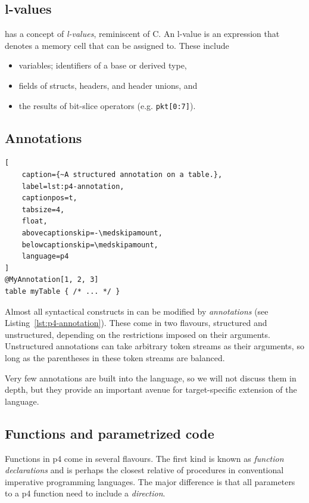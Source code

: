 \subsection*{l-values}

\pfs has a concept of \emph{l-values}, reminiscent of C. An l-value is an
expression that denotes a memory cell that can be assigned to. These include

\begin{itemize}
	\item variables; identifiers of a base or derived type,
	\item fields of structs, headers, and header unions, and
	\item the results of bit-slice operators (e.g. \texttt{pkt[0:7]}).
\end{itemize}

\subsection*{Annotations}

\begin{lstlisting}[
	caption={~A structured annotation on a table.},
	label=lst:p4-annotation,
	captionpos=t,
	tabsize=4,
	float,
	abovecaptionskip=-\medskipamount,
	belowcaptionskip=\medskipamount,
	language=p4
]
@MyAnnotation[1, 2, 3]
table myTable { /* ... */ }
\end{lstlisting}

Almost all syntactical constructs in \pfs can be modified by \emph{annotations}
(see Listing~\ref{lst:p4-annotation}). These come in two flavours, structured
and unstructured, depending on the restrictions imposed on their arguments.
Unstructured annotations can take arbitrary token streams as their arguments, so
long as the parentheses in these token streams are balanced.

Very few annotations are built into the language, so we will not discuss them in
depth, but they provide an important avenue for target-specific extension of the
language.

\subsection*{Functions and parametrized code}

Functions in \acrshort{p4} come in several flavours. The first kind is known as
\emph{function declarations} and is perhaps the closest relative of procedures
in conventional imperative programming languages. The major difference is that
all parameters to a \acrshort{p4} function need to include a \emph{direction}.

